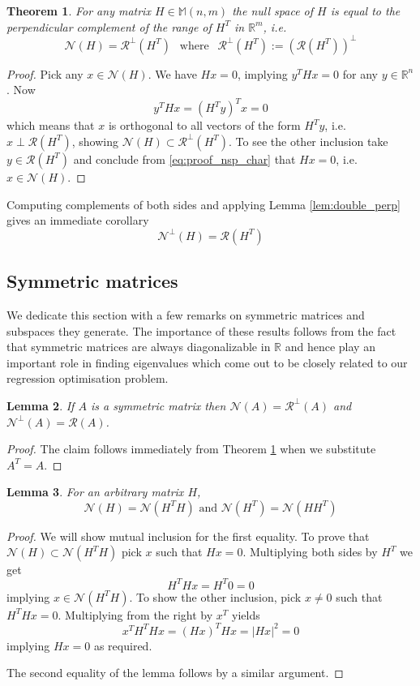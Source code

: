 \documentclass[a4paper,11pt]{article}
\theoremstyle{break}
\newtheorem{theorem}{Theorem}[section]
\newtheorem{lemma}[theorem]{Lemma}
\newcommand{\R}{\mathbb{R}}
\newcommand{\Nu}{\mathcal{N}}
\newcommand{\Ra}{\mathcal{R}}
\newcommand{\Mat}[2]{\mathbb{M}(#1, #2)}
\begin{document}
\begin{theorem} \label{thm:charact_nullspace}
    For any matrix $H \in \Mat{n}{m}$ the null space of $H$ is equal to the perpendicular complement of the range of $H^T$ in $\R^m$, i.e.
    $$\Nu(H) = \Ra^\perp(H^T) ~~\text{ where }~~ \Ra^\perp(H^T) := (\Ra(H^T))^\perp$$
\end{theorem}

\begin{proof}
    Pick any $x \in \Nu(H)$.
    We have $H x = 0$, implying $ y^T H x = 0$ for any $y \in \R^n$. Now
    \begin{equation}\label{eq:proof_nsp_char}
        y^T H x = (H^T y )^T x = 0
    \end{equation}
    which means that $x$ is orthogonal to all vectors of the form $ H^T y $, i.e. $ x \perp \Ra(H^T)$, showing $ \Nu(H) \subset \Ra^\perp(H^T)$. To see the other inclusion take $ y \in \Ra(H^T) $ and conclude from \eqref{eq:proof_nsp_char} that $ H x = 0$, i.e. $ x \in \Nu(H)$.
\end{proof}
Computing complements of both sides and applying Lemma \ref{lem:double_perp} gives an immediate corollary
    $$\Nu^\perp(H) = \Ra(H^T)$$

\subsection{Symmetric matrices}
We dedicate this section with a few remarks on symmetric matrices and subspaces they generate. The importance of these results follows from the fact that symmetric matrices are always diagonalizable in $\R$ and hence play an important role in finding eigenvalues which come out to be closely related to our regression optimisation problem. 

\begin{lemma} \label{lem:charact_sym_nullspace}
    If $A$ is a symmetric matrix then $\Nu(A) = \Ra^\perp(A)$ and $\Nu^\perp(A) = \Ra(A)$.
\end{lemma}
\begin{proof}
    The claim follows immediately from Theorem \ref{thm:charact_nullspace} when we substitute $A^T = A$.
\end{proof}

\begin{lemma}
    \label{lem:nullspaces_hht}
    For an arbitrary matrix $H$,
    $$\Nu(H) = \Nu(H^T H) \text{ and } \Nu(H^T) = \Nu(H H^T)$$
\end{lemma}

\begin{proof}
    We will show mutual inclusion for the first equality. To prove that $\Nu(H) \subset \Nu(H^T H)$ pick $x$ such that $H x = 0$. Multiplying both sides by $H^T$ we get
    $$ H^T H x = H^T 0 = 0 $$
    implying $x \in \Nu(H^T H) $.
    To show the other inclusion, pick $x \neq 0$ such that $H^T H x = 0$. Multiplying from the right by $x^T$ yields
    $$ x^T H^T H x = (H x)^T H x = | H x |^2 = 0 $$
    implying $ H x =0 $ as required.
    
    The second equality of the lemma follows by a similar argument.
\end{proof}
\end{document}
